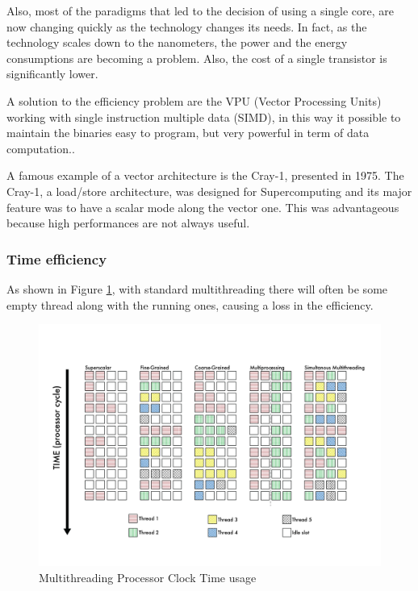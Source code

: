 Also, most of the paradigms that led to the decision of using a single core, are now changing quickly as the technology changes its needs.
In fact, as the technology scales down to the nanometers, the power and the energy consumptions are becoming a problem. Also, the cost of a single transistor is significantly lower.


A solution to the efficiency problem are the VPU (Vector Processing Units) working with single instruction multiple data (SIMD), in this way it possible to maintain the binaries easy to program, but very powerful in term of data computation..

A famous example of a vector architecture is the Cray-1, presented in 1975.
The Cray-1, a load/store architecture, was designed for Supercomputing and its major feature was to have a scalar mode along the vector one. This was advantageous because high performances are not always useful.

\subsubsection{Time efficiency}
As shown in Figure \ref{Multithreading}, with standard multithreading there will often be some empty thread along with the running ones, causing a loss in the efficiency.
\begin{figure}[H]
    \centering
    \includegraphics[scale = 0.5]{Chapter_1/img/threads.png}
    \caption{Multithreading Processor Clock Time usage  \cite{L15-Krste}}
    \label{Multithreading}
\end{figure}

